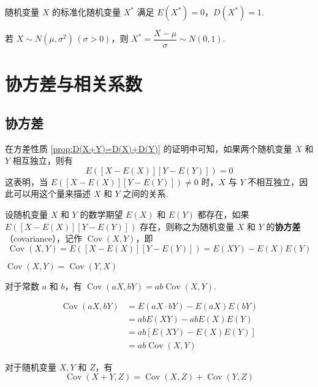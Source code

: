 随机变量 $X$ 的标准化随机变量 $X^*$ 满足 $E(X^*)=0$，$D(X^*)=1$.

\vspace{0.5em}

若 $X \sim N(\mu,\sigma^2) \, (\sigma > 0)$，则 $X^* = \dfrac{X-\mu}{\sigma} \sim N(0,1)$.

\section{协方差与相关系数}

\subsection{协方差}

在方差性质 \ref*{prop:D(X+Y)=D(X)+D(Y)} 的证明中可知，如果两个随机变量 $X$ 和 $Y$ 相互独立，则有
$$
E([X-E(X)][Y-E(Y)]) = 0
$$
这表明，当 $E([X-E(X)][Y-E(Y)]) \not= 0$ 时，$X$ 与 $Y$ 不相互独立，因此可以用这个量来描述 $X$ 和 $Y$ 之间的关系.

\begin{definition}
    设随机变量 $X$ 和 $Y$ 的数学期望 $E(X)$ 和 $E(Y)$ 都存在，如果 $E([X-E(X)][Y-E(Y)])$ 存在，则称之为随机变量 $X$ 和 $Y$ 的\textbf{协方差}（covariance），记作 $\operatorname{Cov}(X,Y)$，即
    $$
    \operatorname{Cov}(X,Y) = E([X-E(X)][Y-E(Y)]) = E(XY) - E(X) E(Y)
    $$
\end{definition}

\setcounter{propertyname}{0}

\begin{property}
    $\operatorname{Cov}(X,Y) = \operatorname{Cov}(Y,X)$
\end{property}

\begin{property}
    对于常数 $a$ 和 $b$，有 $\operatorname{Cov}(aX,bY) = ab \operatorname{Cov}(X,Y)$.
\end{property}

\begin{myproof}
    $$
    \begin{aligned}
        \operatorname{Cov}(aX,bY) &= E(aX \cdot bY) - E(aX) E(bY) \\
        &= ab E(XY) - ab E(X) E(Y) \\
        &= ab[E(XY) - E(X) E(Y)] \\
        &= ab \operatorname{Cov}(X,Y)
    \end{aligned}
    $$
\end{myproof}

\begin{property}
    对于随机变量 $X,Y$ 和 $Z$，有
    $$
    \operatorname{Cov}(X+Y,Z) = \operatorname{Cov}(X,Z) + \operatorname{Cov}(Y,Z)
    $$
\end{property}

